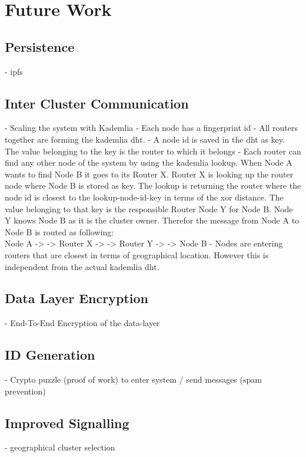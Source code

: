 \section{Future Work}

\subsection{Persistence}
- ipfs

\subsection{Inter Cluster Communication}
- Scaling the system with Kademlia
    - Each node has a fingerprint id
    - All routers together are forming the kademlia dht.
    - A node id is saved in the dht as key. The value belonging to the key is the router to which it belongs 
    - Each router can find any other node of the system by using the kademlia lookup. When Node A wants to find Node B it goes to its Router X. Router X is looking up the router node where Node B is stored as key. The lookup is returning the router where the node id is closest to the lookup-node-id-key in terms of the \gls{xor} distance. The value belonging to that key is the responsible Router Node Y for Node B. Node Y knows Node B as it is the cluster owner. Therefor the message from Node A to Node B is routed as following: \\ Node A -> -> Router X -> -> Router Y -> -> Node B
    - Nodes are entering routers that are closest in terms of geographical location. However this is independent from the actual kademlia dht.

\subsection{Data Layer Encryption}
- End-To-End Encryption of the data-layer

\subsection{ID Generation}
- Crypto puzzle (proof of work) to enter system / send messages (spam prevention)

\subsection{Improved Signalling}
- geographical cluster selection
